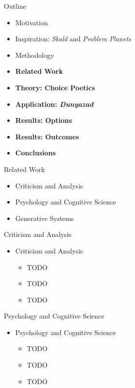 \documentclass[xcolor=x11names]{beamer}
\def\dunyazad/{\textit{Dunyazad}}
\def\skald/{\textit{Skald}}
\def\problemplanets/{\textit{Problem Planets}}
\begin{document}
\begin{frame}{Outline}
  \begin{itemize}
    \item Motivation
    \item Inspiration: \skald/ and \problemplanets/
    \item Methodology
    \item \textbf{Related Work}
    \item \textbf{Theory: Choice Poetics}
    \item \textbf{Application: \dunyazad/}
    \item \textbf{Results: Options}
    \item \textbf{Results: Outcomes}
    \item \textbf{Conclusions}
  \end{itemize}
\end{frame}

\begin{frame}{Related Work}
  \begin{itemize}\addtolength{\itemsep}{0.5\baselineskip}
    \item Criticism and Analysis
    \item Psychology and Cognitive Science
    \item Generative Systems
  \end{itemize}
\end{frame}

\begin{frame}{Criticism and Analysis}
  \begin{itemize}\addtolength{\itemsep}{0.5\baselineskip}
    \item Criticism and Analysis
    \begin{itemize}\addtolength{\itemsep}{0.5\baselineskip}
      \vspace{0.5\baselineskip}
      \item TODO
      \item TODO
      \item TODO
    \end{itemize}
  \end{itemize}
\end{frame}

\begin{frame}{Psychology and Cognitive Science}
  \begin{itemize}\addtolength{\itemsep}{0.5\baselineskip}
    \item Psychology and Cognitive Science
    \begin{itemize}\addtolength{\itemsep}{0.5\baselineskip}
      \vspace{0.5\baselineskip}
      \item TODO
      \item TODO
      \item TODO
    \end{itemize}
  \end{itemize}
\end{frame}
\end{document}
